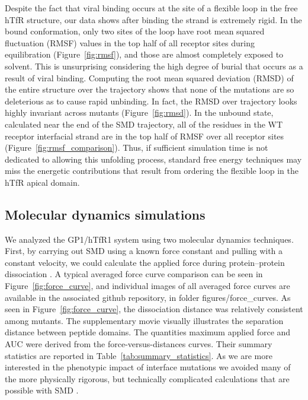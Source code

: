 \documentclass[12pt]{article}
\begin{document}
Despite the fact that viral binding occurs at the site of a flexible loop in the free hTfR structure, our data shows after binding the strand is extremely rigid. In the bound conformation, only two sites of the loop have root mean squared fluctuation (RMSF) values in the top half of all receptor sites during equilibration (Figure~\ref{fig:rmsf}), and those are almost completely exposed to solvent. This is unsurprising considering the high degree of burial that occurs as a result of viral binding. Computing the root mean squared deviation (RMSD) of the entire structure over the trajectory shows that none of the mutations are so deleterious as to cause rapid unbinding. In fact, the RMSD over trajectory looks highly invariant across mutants (Figure~\ref{fig:rmsd}). In the unbound state, calculated near the end of the SMD trajectory, all of the residues in the WT receptor interfacial strand are in the top half of RMSF over all receptor sites (Figure~\ref{fig:rmsf_comparison}). Thus, if sufficient simulation time is not dedicated to allowing this unfolding process, standard free energy techniques may miss the energetic contributions that result from ordering the flexible loop in the hTfR apical domain.

\subsection{Molecular dynamics simulations}

We analyzed the GP1/hTfR1 system using two molecular dynamics techniques. First, by carrying out SMD using a known force constant and pulling with a constant velocity, we could calculate the applied force during protein--protein dissociation \citep{Cuendet2008,Cuendet2011}. A typical averaged force curve comparison can be seen in Figure~\ref{fig:force_curve}, and individual images of all averaged force curves are available in the associated github repository, in folder figures/force\_curves. As seen in Figure~\ref{fig:force_curve}, the dissociation distance was relatively consistent among mutants.  The supplementary movie visually illustrates the separation distance between peptide domains. The quantities maximum applied force and AUC were derived from the force-versus-distances curves. Their summary statistics are reported in Table~\ref{tab:summary_statistics}. As we are more interested in the phenotypic impact of interface mutations we avoided many of the more physically rigorous, but technically complicated calculations that are possible with SMD \citep{Is2001A,Is2001B}.
\end{document}

